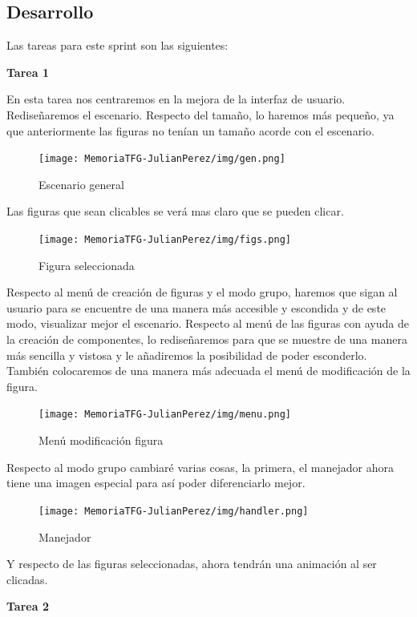 \documentclass[a4paper, 12pt]{book}
\begin{document}
\subsection{Desarrollo}
Las tareas para este sprint son las siguientes:

\textbf{Tarea 1}

En esta tarea nos centraremos en la mejora de la interfaz de usuario. Rediseñaremos el escenario. Respecto del tamaño, lo haremos más pequeño, ya que anteriormente las figuras no tenían un tamaño acorde con el escenario.

\begin{figure}[H]
  \centering
  \texttt{[image: MemoriaTFG-JulianPerez/img/gen.png]}
  \caption{Escenario general}\label{gen}
\end{figure}

Las figuras que sean clicables se verá mas claro que se pueden clicar.
\begin{figure}[H]
  \centering
  \texttt{[image: MemoriaTFG-JulianPerez/img/figs.png]}
  \caption{Figura seleccionada}\label{scrum}
\end{figure}

Respecto al menú de creación de figuras y el modo grupo, haremos que sigan al usuario para se encuentre de una manera más accesible y escondida y de este modo, visualizar mejor el escenario. Respecto al menú de las figuras con ayuda de la creación de componentes, lo rediseñaremos para que se muestre de una manera más sencilla y vistosa y le añadiremos la posibilidad de poder esconderlo. También colocaremos de una manera más adecuada el menú de modificación de la figura. 

\begin{figure}[H]
  \centering
  \texttt{[image: MemoriaTFG-JulianPerez/img/menu.png]}
  \caption{Menú modificación figura}\label{scrum}
\end{figure}

Respecto al modo grupo cambiaré varias cosas, la primera, el manejador ahora tiene una imagen especial para así poder diferenciarlo mejor.

\begin{figure}[H]
  \centering
  \texttt{[image: MemoriaTFG-JulianPerez/img/handler.png]}
  \caption{Manejador}\label{scrum}
\end{figure}

Y respecto de las figuras seleccionadas, ahora tendrán una animación al ser clicadas.

\textbf{Tarea 2}
\end{document}
